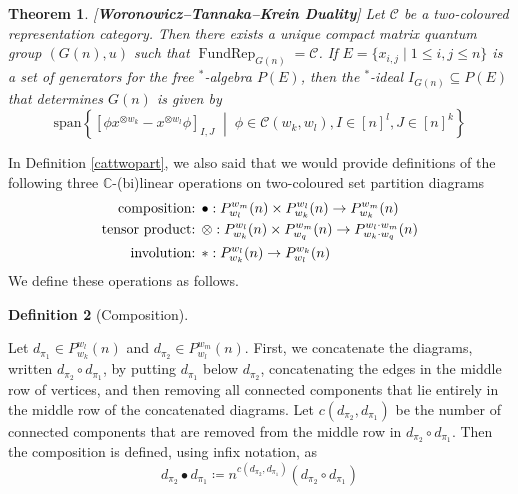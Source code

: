 \documentclass{article}
\DeclareMathOperator{\FundRep}{FundRep}
\theoremstyle{plain}
\newtheorem{theorem}{Theorem}[section]
\theoremstyle{definition}
\newtheorem{definition}[theorem]{Definition}
\theoremstyle{remark}
\begin{document}
\begin{theorem} \label{tannakakreinfull}
	[\textbf{Woronowicz--Tannaka--Krein Duality}]
	Let $\mathcal{C}$ be a two-coloured representation category.
	Then there exists a unique compact matrix quantum group $(G(n), u)$ such that
	$\FundRep_{G(n)} = \mathcal{C}$.
	If $E = \{x_{i,j} \mid 1 \leq i,j \leq n\}$ is a set of generators for the
	free $^*$-algebra $P(E)$, then the $^*$-ideal $I_{G(n)} \subseteq P(E)$
	that determines $G(n)$ is given by
	\begin{equation}
		\text{span}
		\left\{ 
		[\phi x^{\otimes w_k} - x^{\otimes w_l} \phi]_{I,J}
		\;\middle\vert\;
			\phi \in \mathcal{C}(w_k, w_l), I \in [n]^l, J \in [n]^k
		\right\}
	\end{equation}
\end{theorem}

In Definition \ref{cattwopart},
we also said that we would provide definitions of 
the following three $\mathbb{C}$-(bi)linear operations on two-coloured set partition diagrams
\begin{align}
	\text{\textbf{composition:}   } & \bullet: P_{w_l}^{w_m}(n) \times P_{w_k}^{w_l}(n) \rightarrow P_{w_k}^{w_m}(n) \\
	\text{\textbf{tensor product:}   } & \otimes: P_{w_k}^{w_l}(n) \times P_{w_q}^{w_m}(n) \rightarrow P_{w_k \cdot w_q}^{w_l \cdot w_m}(n) \\
	\text{\textbf{involution:}   } & *: P_{w_k}^{w_l}(n)
	\rightarrow P_{w_l}^{w_k}(n)
\end{align}
We define these operations as follows.

\begin{definition}[Composition] \label{qgroupcomposition}

Let $d_{\pi_1} \in P_{w_k}^{w_l}(n)$ and $d_{\pi_2} \in P_{w_l}^{w_m}(n)$. 
		First, we concatenate the diagrams, written $d_{\pi_2} \circ d_{\pi_1}$, by putting $d_{\pi_1}$ below $d_{\pi_2}$, concatenating the edges in the middle row of vertices, and then removing all connected components that lie entirely in the middle row of the concatenated diagrams. 
Let $c(d_{\pi_2}, d_{\pi_1})$ be the number of connected components that are removed from the middle row in $d_{\pi_2} \circ d_{\pi_1}$.
		Then the composition is defined, using infix notation, as
\begin{equation} 
	d_{\pi_2} \bullet d_{\pi_1} 
	\coloneqq 
	n^{c(d_{\pi_2}, d_{\pi_1})} (d_{\pi_2} \circ d_{\pi_1})
\end{equation}
\end{definition}
\end{document}
